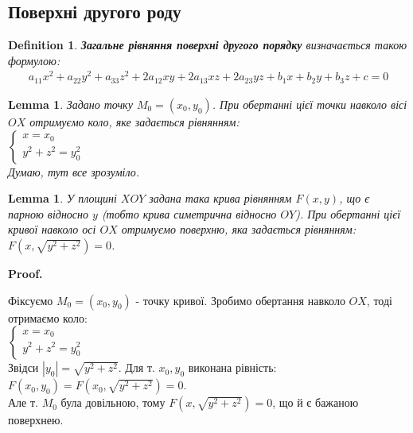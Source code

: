 \documentclass[a4paper, 10pt]{extarticle}
\makeatletter
\def\qed{$\blacksquare$}
\def\qed{$\blacksquare$}
\theoremstyle{theoremdd}
\theoremstyle{theoremdd}
\newtheorem{definition}[theorem]{Definition}
\theoremstyle{theoremdd}
\theoremstyle{theoremdd}
\theoremstyle{theoremdd}
\theoremstyle{theoremdd}
\theoremstyle{theoremdd}
\newtheorem{lemma}[theorem]{Lemma}
\theoremstyle{theoremdd}
\renewenvironment{proof}[1][Proof.\\]{\par
\pushQED{\hfill \qed}%
\normalfont \topsep6\p@\@plus6\p@\relax
\trivlist
\item\relax
{\bfseries
#1\@addpunct{.}}\hspace\labelsep\ignorespaces
}{%
\popQED\endtrivlist\@endpefalse
}
\makeatother
\begin{document}
\subsection{Поверхні другого роду}
\begin{definition}
\textbf{Загальне рівняння поверхні другого порядку} визначається такою формулою:
\begin{align*}
a_{11}x^2 + a_{22}y^2 + a_{33}z^2 + 2a_{12}xy + 2a_{13}xz + 2a_{23}yz + b_1x + b_2y + b_3z + c = 0
\end{align*}
\end{definition}

\begin{lemma}
Задано точку $M_0 = (x_0,y_0)$. При обертанні цієї точки навколо вісі $OX$ отримуємо коло, яке задається рівнянням:\\
$\begin{cases}
x = x_0 \\
y^2 + z^2 = y_0^2
\end{cases}
$\\
\textit{Думаю, тут все зрозуміло}.
\begin{figure}[H]
\centering
{}
\end{figure}
\end{lemma}

\begin{lemma}
У площині $XOY$ задана така крива рівнянням $F(x,y)$, що є парною відносно $y$ (тобто крива симетрична відносно $OY$). При обертанні цієї кривої навколо осі $OX$ отримуємо поверхню, яка задається рівнянням:\\
$F(x,\sqrt{y^2+z^2})=0$.
\end{lemma}

\begin{proof}
Фіксуємо $M_0 = (x_0,y_0)$ - точку кривої. Зробимо обертання навколо $OX$, тоді отримаємо коло:\\
$\begin{cases}
x = x_0 \\
y^2 + z^2 = y_0^2
\end{cases}
$\\
Звідси $|y_0| = \sqrt{y^2+z^2}$. Для т. $x_0,y_0$ виконана рівність:\\
$F(x_0,y_0) = F(x_0, \sqrt{y^2+z^2}) = 0$.\\
Але т. $M_0$ була довільною, тому $F(x,\sqrt{y^2+z^2})=0$, що й є бажаною поверхнею.
\end{proof}
\end{document}
